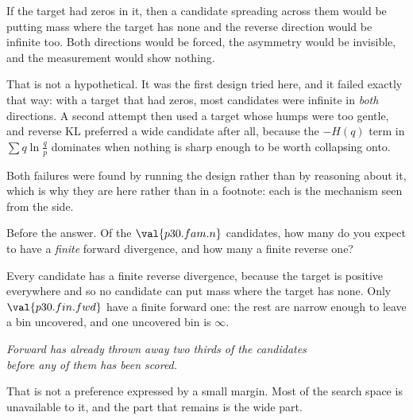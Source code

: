 \begin{fr}

If the target had zeros in it, then a candidate spreading across them would
be putting mass where the target has none \dash{} and the reverse direction
would be infinite too. Both directions would be forced, the asymmetry would
be invisible, and the measurement would show nothing.

\begin{note}
That is not a hypothetical. It was the first design tried here, and it
failed exactly that way: with a target that had zeros, most candidates were
infinite in \emph{both} directions. A second attempt then used a target
whose humps were too gentle, and reverse KL preferred a wide candidate after
all, because the $-H(q)$ term in $\sum q \ln \frac{q}{p}$ dominates when
nothing is sharp enough to be worth collapsing onto.

Both failures were found by running the design rather than by reasoning about
it, which is why they are here rather than in a footnote: each is the
mechanism seen from the side.
\end{note}
\end{fr}

\begin{fr}
Before the answer. Of the $\val{p30.fam.n}$ candidates, how many do you
expect to have a \emph{finite} forward divergence, and how many a finite
reverse one?
\dotline
\nextframe
\end{fr}

\begin{fr}

Every candidate has a finite reverse divergence, because the target is
positive everywhere and so no candidate can put mass where the target has
none. Only $\val{p30.fin.fwd}$ have a finite forward one: the rest are narrow
enough to leave a bin uncovered, and one uncovered bin is $\infty$.

\begin{center}
\emph{Forward has already thrown away two thirds of the candidates\\
before any of them has been scored.}
\end{center}

That is not a preference expressed by a small margin. Most of the search
space is unavailable to it, and the part that remains is the wide part.
\end{fr}

